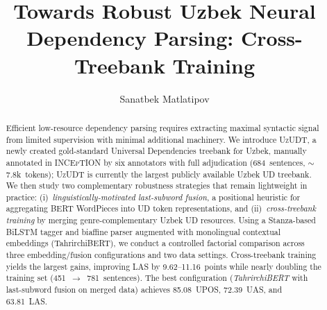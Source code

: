 \documentclass[runningheads]{llncs}
\begin{document}
%
\title{Towards Robust Uzbek Neural Dependency Parsing: Cross-Treebank Training}
%
%
\author{Sanatbek Matlatipov}
%
%
%
\maketitle              %
%
\begin{abstract}
Efficient low-resource dependency parsing requires extracting maximal
syntactic signal from limited supervision with minimal additional
machinery. We introduce \textsc{UzUDT}, a newly created gold-standard Universal Dependencies treebank for Uzbek, manually annotated in
\textsc{INCEpTION} by six annotators with full adjudication
(684~sentences, \mbox{$\sim$7.8k}~tokens); \textsc{UzUDT} is
currently the largest publicly available Uzbek UD treebank.
We then study two complementary robustness strategies that remain
lightweight in practice:
(i)~\emph{linguistically-motivated last-subword fusion}, a positional
heuristic for aggregating BERT WordPieces into UD token
representations, and
(ii)~\emph{cross-treebank training} by merging genre-complementary
Uzbek UD resources.
Using a Stanza-based BiLSTM tagger and biaffine parser augmented with monolingual contextual embeddings (TahrirchiBERT), we conduct a
controlled factorial comparison across three embedding\slash fusion
configurations and two data settings. Cross-treebank training yields the largest gains, improving LAS by 9.62--11.16~points while nearly doubling the training set (451~$\rightarrow$~781~sentences).
The best configuration (\textit{TahrirchiBERT} with last-subword
fusion on merged data) achieves 85.08~UPOS, 72.39~UAS, and
63.81~LAS.
\end{abstract}

%
%
%
\end{document}
